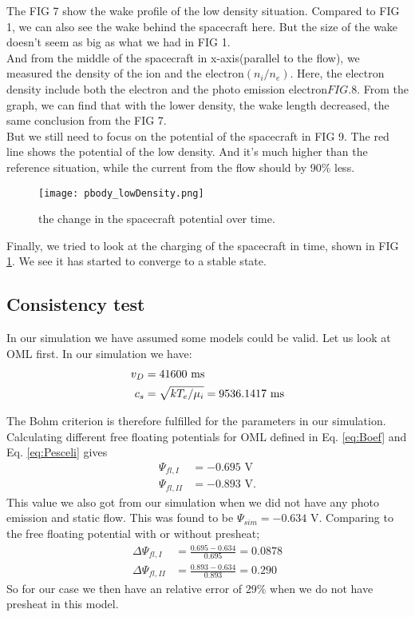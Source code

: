 \documentclass[aip, 
rsi, 
amsmath,
amssymb,
longbibliography,
preprint]{revtex4-1}
\begin{document}
The FIG 7 show the wake profile of the low density situation. Compared to FIG 1, we can also see the wake behind the spacecraft here. But the size of the wake doesn't seem as big as what we had in FIG 1.\\

And from the middle of the spacecraft in x-axis(parallel to the flow), we measured the density of the ion and the electron$(n_i/n_e)$. Here, the electron density include both the electron and the photo emission electron\(FIG.8\). From the graph, we can find that with the lower density, the wake length decreased, the same conclusion from the FIG 7.\\

But we still need to focus on the potential of the spacecraft in FIG 9. The red line shows the potential of the low density. And it's much higher than the reference situation, while the current from the flow should by 90\% less.

\begin{figure}[!ht]
\texttt{[image: pbody\_lowDensity.png]}
\caption{the change in the spacecraft potential over time.\label{fig:DensityTime}}
\end{figure}

Finally, we tried to look at the charging of the spacecraft in time, shown in FIG \ref{fig:DensityTime}. We see it has started to converge to a stable state.

\subsection{Consistency test}

In our simulation we have assumed some models could be valid. Let us look at OML first. In our simulation we have:
\begin{align*}
v_D &= 41600 \, \, \text{m\/s}\\
c_s &= \sqrt{k T_e / \mu_i} = 9536.1417 \, \, \text{m\/s}
\end{align*}

The Bohm criterion is therefore fulfilled for the parameters in our simulation. Calculating different free floating potentials for OML defined in Eq. \ref{eq:Boef} and Eq. \ref{eq:Pesceli} gives
\begin{align*}
\Psi_{fl,I} &= -0.695 \, \, \text{V}\\
\Psi_{fl,II}&= -0.893 \, \, \text{V}.
\end{align*}
This value we also got from our simulation when we did not have any photo emission and static flow. This was found to be $\Psi_{sim} = -0.634$ V. Comparing to the free floating potential with or without presheat;
\begin{align*}
\Delta \Psi_{fl,I} &= \frac{0.695-0.634}{0.695} = 0.0878\\
\Delta \Psi_{fl,II} &= \frac{0.893-0.634}{0.893} = 0.290
\end{align*}
So for our case we then have an relative error of 29\% when we do not have presheat in this model.\\
\end{document}
